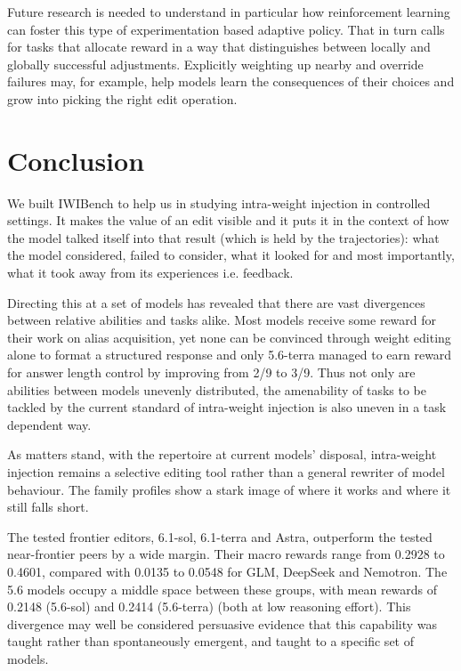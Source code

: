 Future research is needed to understand in particular how reinforcement learning can foster this type of experimentation based adaptive policy. That in turn calls for tasks that allocate reward in a way that distinguishes between locally and globally successful adjustments. Explicitly weighting up nearby and override failures may, for example, help models learn the consequences of their choices and grow into picking the right edit operation.

\section{Conclusion}\label{conclusion}

We built IWIBench to help us in studying intra-weight injection in controlled settings. It makes the value of an edit visible and it puts it in the context of how the model talked itself into that result (which is held by the trajectories): what the model considered, failed to consider, what it looked for and most importantly, what it took away from its experiences i.e. feedback. 

Directing this at a set of models has revealed that there are vast divergences between relative abilities and tasks alike. Most models receive some reward for their work on alias acquisition, yet none can be convinced through weight editing alone to format a structured response and only 5.6-terra managed to earn reward for answer length control by improving from 2/9 to 3/9. Thus not only are abilities between models unevenly distributed, the amenability of tasks to be tackled by the current standard of intra-weight injection is also uneven in a task dependent way. 

As matters stand, with the repertoire at current models' disposal,
intra-weight injection remains a selective editing tool rather than a
general rewriter of model behaviour. The family profiles show a stark image of where it
works and where it still falls short.

The tested frontier editors, 6.1-sol, 6.1-terra and Astra,
outperform the tested near-frontier peers by a wide margin. Their macro
rewards range from 0.2928 to 0.4601, compared with 0.0135 to 0.0548 for
GLM, DeepSeek and Nemotron. The 5.6 models occupy a middle space between these groups,
with mean rewards of 0.2148 (5.6-sol) and 0.2414 (5.6-terra) (both at low
reasoning effort). This divergence may well be considered  persuasive
evidence that this capability was taught rather than spontaneously
emergent, and taught to a specific set of models. 

